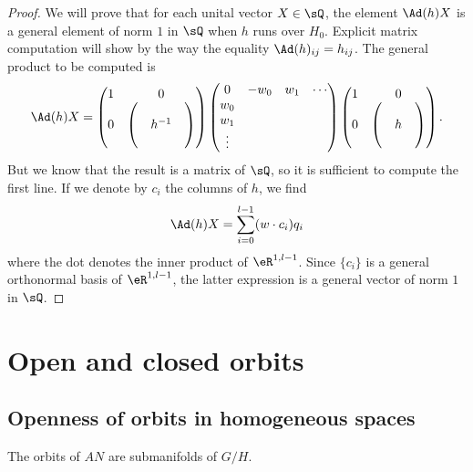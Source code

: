 \begin{proof}
We will prove that for each unital vector $X\in\sQ$, the element $\Ad(h)X$ is a general element of norm $1$ in $\sQ$ when $h$ runs over $H_0$. Explicit matrix computation will show by the way the equality  $\Ad(h)_{ij}=h_{ij}$. The general product to be computed is
\[ 
\Ad(h)X=
  \begin{pmatrix}
1	&	0\\
0	&
\begin{pmatrix}
&&\\
&h^{-1}\\
&&
\end{pmatrix}
\end{pmatrix}
\begin{pmatrix}
0&-w_0&w_1&\cdots\\
w_0\\
w_1\\
\vdots
\end{pmatrix}
  \begin{pmatrix}
1	&	0\\
0	&
\begin{pmatrix}
&&\\
&h\\
&&
\end{pmatrix}
\end{pmatrix}.
\]
But we know that the result is a matrix of $\sQ$, so it is sufficient to compute the first line. If we denote by $c_i$ the columns of $h$, we find
\[ 
  \Ad(h)X=\sum_{i=0}^{l-1}(w\cdot c_i)q_i
\]
where the dot denotes the inner product of $\eR^{1,l-1}$. Since $\{ c_i \}$ is a general orthonormal basis of $\eR^{1,l-1}$, the latter expression is a general vector of norm $1$ in $\sQ$.
\end{proof}

\section{Open and closed orbits}

\subsection{Openness of orbits in homogeneous spaces} \label{subsec:question}

\begin{proposition} \label{pg:orbit_ssvar}
The orbits of $AN$ are submanifolds of $G/H$.
\end{proposition}

